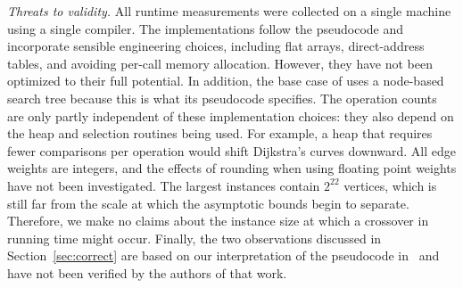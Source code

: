 \emph{Threats to validity.} All runtime measurements were collected on a single machine using a
single compiler. The implementations follow the pseudocode and incorporate sensible engineering
choices, including flat arrays, direct-address tables, and avoiding per-call memory allocation.
However, they have not been optimized to their full potential. In addition, the base case of \bmB{}
uses a node-based search tree because this is what its pseudocode specifies. The operation counts
are only partly independent of these implementation choices: they also depend on the heap and
selection routines being used. For example, a heap that requires fewer comparisons per operation
would shift Dijkstra's curves downward. All edge weights are integers, and the effects of rounding
when using floating point weights have not been investigated. The largest instances contain $2^{22}$
vertices, which is still far from the scale at which the asymptotic bounds begin to separate.
Therefore, we make no claims about the instance size at which a crossover in running time might
occur. Finally, the two observations discussed in Section~\ref{sec:correct} are based on our
interpretation of the pseudocode in~\cite{duan2026} and have not been verified by the authors of
that work.
